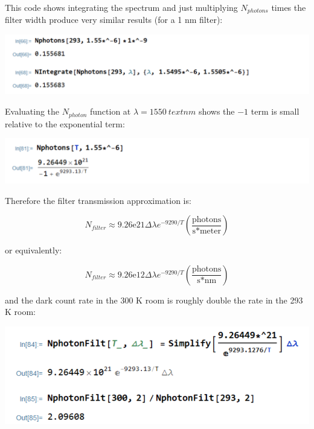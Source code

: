 \documentclass[12pt]{caltech_thesis}
\begin{document}
\begin{enumerate}
{  }

  {\color{midnightblue} This code shows integrating the spectrum and
  just multiplying \(N_{photons}\) times the filter width produce very
  similar results (for a 1 nm filter):}

  {\color{midnightblue} \includegraphics{chapter_05/figs_05/nphoton_approx.PNG}}

  {\color{midnightblue} Evaluating the \(N_{photon}\) function at
  \(\lambda = 1550~text{nm}\) shows the \(-1\) term is small relative to
  the exponential term:}

  {\color{midnightblue} \includegraphics{chapter_05/figs_05/small_relative_to_exponential.PNG}}

  {\color{midnightblue} Therefore the filter transmission approximation
  is:}

  {\color{midnightblue} 

  \[\boxed{N_{filter} \approx 9.26\mathrm{e}21 \Delta\lambda e^{-9290/T} (\frac{\text{photons}}{\text{s*meter}})}\]

  }

  {\color{midnightblue} or equivalently: }

  {\color{midnightblue} 

  \[\boxed{N_{filter} \approx 9.26\mathrm{e}12 \Delta\lambda e^{-9290/T} (\frac{\text{photons}}{\text{s*nm}})}\]

  }

  {\color{midnightblue} and the dark count rate in the 300 K room is
  roughly double the rate in the 293 K room: }

  {\color{midnightblue} \includegraphics{chapter_05/figs_05/filter_with_temp.PNG}}


\end{enumerate}
\end{document}
